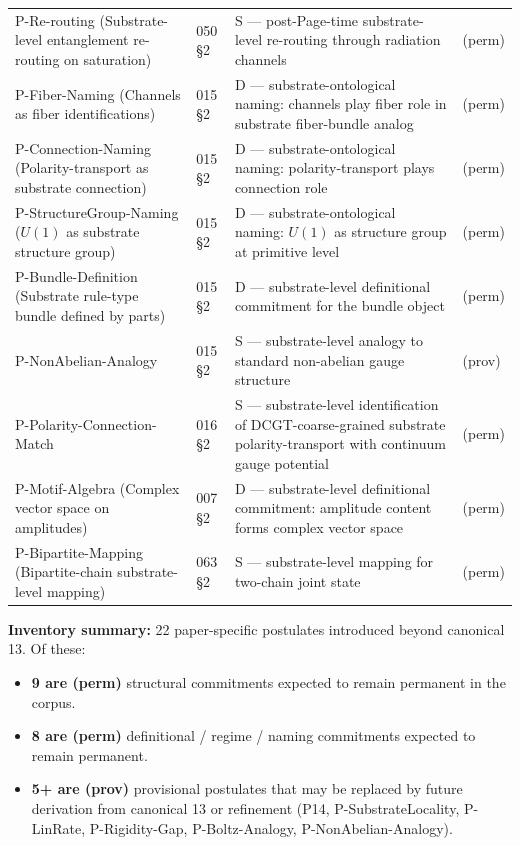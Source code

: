\documentclass[11pt,a4paper]{article}
\begin{document}
{\begin{longtable}{p{}p{}p{}p{}}
P-Re-routing (Substrate-level entanglement re-routing on saturation) & 050 \S2 & S --- post-Page-time substrate-level re-routing through radiation channels & (perm) \\
P-Fiber-Naming (Channels as fiber identifications) & 015 \S2 & D --- substrate-ontological naming: channels play fiber role in substrate fiber-bundle analog & (perm) \\
P-Connection-Naming (Polarity-transport as substrate connection) & 015 \S2 & D --- substrate-ontological naming: polarity-transport plays connection role & (perm) \\
P-StructureGroup-Naming ($U(1)$ as substrate structure group) & 015 \S2 & D --- substrate-ontological naming: $U(1)$ as structure group at primitive level & (perm) \\
P-Bundle-Definition (Substrate rule-type bundle defined by parts) & 015 \S2 & D --- substrate-level definitional commitment for the bundle object & (perm) \\
P-NonAbelian-Analogy & 015 \S2 & S --- substrate-level analogy to standard non-abelian gauge structure & (prov) \\
P-Polarity-Connection-Match & 016 \S2 & S --- substrate-level identification of DCGT-coarse-grained substrate polarity-transport with continuum gauge potential & (perm) \\
P-Motif-Algebra (Complex vector space on amplitudes) & 007 \S2 & D --- substrate-level definitional commitment: amplitude content forms complex vector space & (perm) \\
P-Bipartite-Mapping (Bipartite-chain substrate-level mapping) & 063 \S2 & S --- substrate-level mapping for two-chain joint state & (perm) \\
\bottomrule
\end{longtable}
}

\textbf{Inventory summary:} 22 paper-specific postulates introduced beyond canonical 13. Of these:

\begin{itemize}[noitemsep]
\item \textbf{9 are (perm)} structural commitments expected to remain permanent in the corpus.
\item \textbf{8 are (perm)} definitional / regime / naming commitments expected to remain permanent.
\item \textbf{5+ are (prov)} provisional postulates that may be replaced by future derivation from canonical 13 or refinement (P14, P-SubstrateLocality, P-LinRate, P-Rigidity-Gap, P-Boltz-Analogy, P-NonAbelian-Analogy).
\end{itemize}
\end{document}
